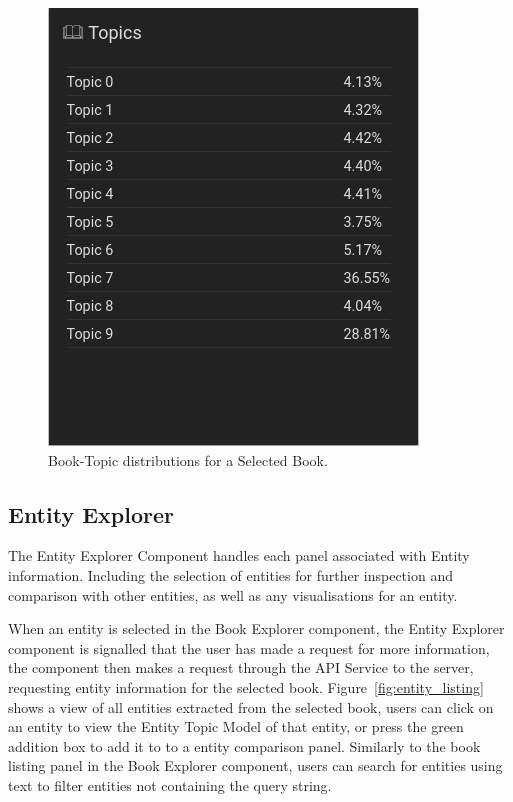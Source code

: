 \documentclass[10pt]{report}
\begin{document}
\begin{figure}[h]
  \centering
  \includegraphics[scale=0.5]{book_topic_distr}
  \caption{Book-Topic distributions for a Selected Book. \label{fig:book_topic_inspect}}
\end{figure}

\subsection{Entity Explorer}
The Entity Explorer Component handles each panel associated with Entity information. Including the selection of entities for further inspection and comparison with other entities, as well as any visualisations for an entity.

When an entity is selected in the Book Explorer component, the Entity Explorer component is signalled that the user has made a request for more information, the component then makes a request through the API Service to the server, requesting entity information for the selected book. Figure~\ref{fig:entity_listing} shows a view of all entities extracted from the selected book, users can click on an entity to view the Entity Topic Model of that entity, or press the green addition box to add it to to a entity comparison panel. Similarly to the book listing panel in the Book Explorer component, users can search for entities using text to filter entities not containing the query string.
\end{document}

